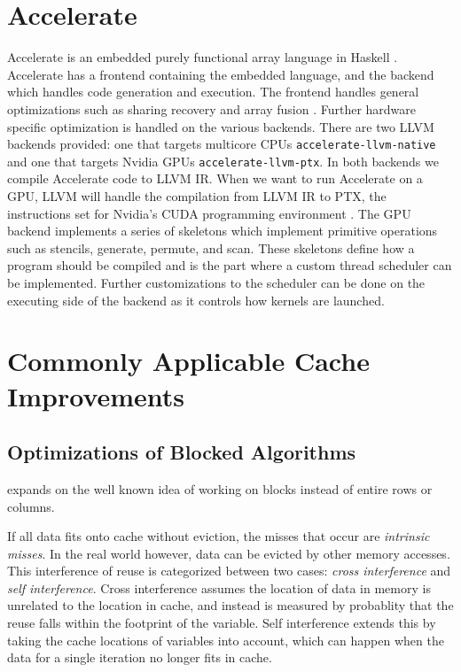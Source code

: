 \section{Accelerate}
\label{sec:accelerate}
Accelerate is an embedded purely functional array language in Haskell \cite{chakravarty2011accelerating}.
Accelerate has a frontend containing the embedded language, and the backend which handles code generation and execution.
The frontend handles general optimizations such as sharing recovery and array fusion \cite{mcdonell2013optimising,balen2020optimal}.
Further hardware specific optimization is handled on the various backends.
There are two LLVM \cite{llvm} backends provided: one that targets multicore CPUs \texttt{accelerate-llvm-native} and one that targets Nvidia GPUs \texttt{accelerate-llvm-ptx}.
In both backends we compile Accelerate code to LLVM IR.
When we want to run Accelerate on a GPU, LLVM will handle the compilation from LLVM IR to PTX, the instructions set for Nvidia's CUDA programming environment \cite{mcdonell2015type, llvm, nvidia2021cudadocs}.
The GPU backend implements a series of skeletons which implement primitive operations such as stencils, generate, permute, and scan.
These skeletons define how a program should be compiled and is the part where a custom thread scheduler can be implemented.
Further customizations to the scheduler can be done on the executing side of the backend as it controls how kernels are launched.

\section{Commonly Applicable Cache Improvements}

\subsection{Optimizations of Blocked Algorithms}
\label{sec:optimization_blocked}
\citet{lam1991cache} expands on the well known idea of working on blocks instead of entire rows or columns.

If all data fits onto cache without eviction, the misses that occur are \textit{intrinsic misses}.
In the real world however, data can be evicted by other memory accesses.
This interference of reuse is categorized between two cases: \textit{cross interference} and \textit{self interference}.
Cross interference assumes the location of data in memory is unrelated to the location in cache, and instead is measured by probablity that the reuse falls within the footprint of the variable.
Self interference extends this by taking the cache locations of variables into account, which can happen when the data for a single iteration no longer fits in cache.


